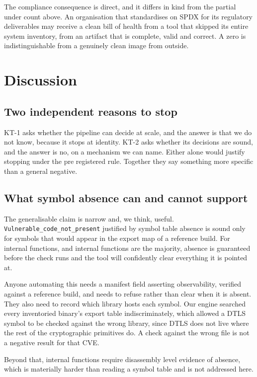 The compliance consequence is direct, and it differs in kind from the partial
under count above. An organisation that standardises on SPDX for its regulatory
deliverables may receive a clean bill of health from a tool that skipped its
entire system inventory, from an artifact that is complete, valid and correct. A
zero is indistinguishable from a genuinely clean image from outside.

\section{Discussion}

\subsection{Two independent reasons to stop}

KT-1 asks whether the pipeline can decide at scale, and the answer is that we do
not know, because it stops at identity. KT-2 asks whether its decisions are
sound, and the answer is no, on a mechanism we can name. Either alone would
justify stopping under the pre registered rule. Together they say something more
specific than a general negative.

\subsection{What symbol absence can and cannot support}

The generalisable claim is narrow and, we think, useful.
\texttt{Vulnerable\_code\_not\_present} justified by symbol table absence is sound
only for symbols that would appear in the export map of a reference build. For
internal functions, and internal functions are the majority, absence is
guaranteed before the check runs and the tool will confidently clear everything
it is pointed at.

Anyone automating this needs a manifest field asserting observability, verified
against a reference build, and needs to refuse rather than clear when it is
absent. They also need to record which library hosts each symbol. Our engine
searched every inventoried binary's export table indiscriminately, which allowed
a DTLS symbol to be checked against the wrong library, since DTLS does not live
where the rest of the cryptographic primitives do. A check against the wrong file
is not a negative result for that CVE.

Beyond that, internal functions require disassembly level evidence of absence,
which is materially harder than reading a symbol table and is not addressed here.

